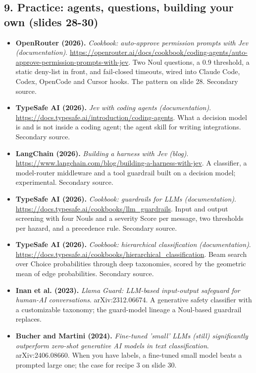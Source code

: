 \documentclass[11pt,letterpaper]{article}
\begin{document}
\subsection*{9. Practice: agents, questions, building your own (slides 28-30)}
\begin{itemize}[leftmargin=1.2em,itemsep=3pt]\sloppy
\item \textbf{OpenRouter (2026).} \textit{Cookbook: auto-approve permission prompts with Jev (documentation)}. \url{https://openrouter.ai/docs/cookbook/coding-agents/auto-approve-permission-prompts-with-jev}. Two Noul questions, a 0.9 threshold, a static deny-list in front, and fail-closed timeouts, wired into Claude Code, Codex, OpenCode and Cursor hooks. The pattern on slide 28. Secondary source.
\item \textbf{TypeSafe AI (2026).} \textit{Jev with coding agents (documentation)}. \url{https://docs.typesafe.ai/introduction/coding-agents}. What a decision model is and is not inside a coding agent; the agent skill for writing integrations. Secondary source.
\item \textbf{LangChain (2026).} \textit{Building a harness with Jev (blog)}. \url{https://www.langchain.com/blog/building-a-harness-with-jev}. A classifier, a model-router middleware and a tool guardrail built on a decision model; experimental. Secondary source.
\item \textbf{TypeSafe AI (2026).} \textit{Cookbook: guardrails for LLMs (documentation)}. \url{https://docs.typesafe.ai/cookbooks/llm_guardrails}. Input and output screening with four Nouls and a severity Score per message, two thresholds per hazard, and a precedence rule. Secondary source.
\item \textbf{TypeSafe AI (2026).} \textit{Cookbook: hierarchical classification (documentation)}. \url{https://docs.typesafe.ai/cookbooks/hierarchical_classification}. Beam search over Choice probabilities through deep taxonomies, scored by the geometric mean of edge probabilities. Secondary source.
\item \textbf{Inan et al. (2023).} \textit{Llama Guard: LLM-based input-output safeguard for human-AI conversations}. arXiv:2312.06674. A generative safety classifier with a customizable taxonomy; the guard-model lineage a Noul-based guardrail replaces.
\item \textbf{Bucher and Martini (2024).} \textit{Fine-tuned 'small' LLMs (still) significantly outperform zero-shot generative AI models in text classification}. arXiv:2406.08660. When you have labels, a fine-tuned small model beats a prompted large one; the case for recipe 3 on slide 30.
\end{itemize}
\clearpage
\printindex
\end{document}
